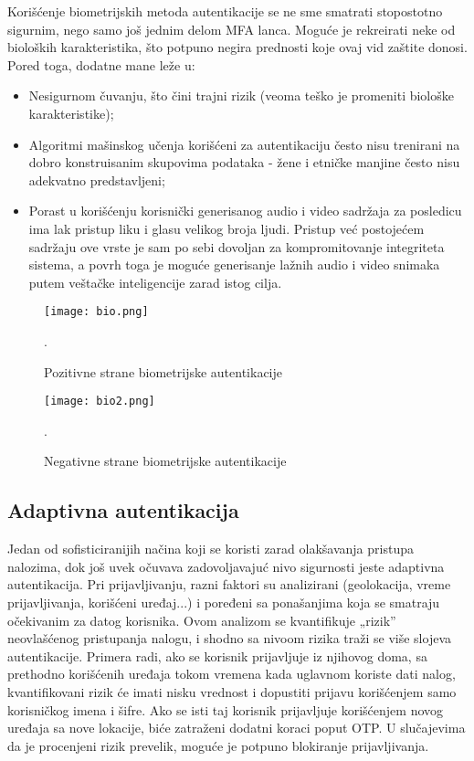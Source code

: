 \documentclass[fleqn, 12pt]{article}
\begin{document}
Korišćenje biometrijskih metoda autentikacije se ne sme smatrati stopostotno sigurnim, nego samo još jednim delom MFA lanca. Moguće je rekreirati neke od bioloških karakteristika, što potpuno negira prednosti koje ovaj vid zaštite donosi\cite{bio}. Pored toga, dodatne mane leže u:

\begin{itemize}
    \item Nesigurnom čuvanju, što čini trajni rizik (veoma teško je promeniti biološke karakteristike);
    \item Algoritmi mašinskog učenja korišćeni za autentikaciju često nisu trenirani na dobro konstruisanim skupovima podataka - žene i etničke manjine često nisu adekvatno predstavljeni;
    \item Porast u korišćenju korisnički generisanog audio i video sadržaja za posledicu ima lak pristup liku i glasu velikog broja ljudi. Pristup već postojećem sadržaju ove vrste je sam po sebi dovoljan za kompromitovanje integriteta sistema, a povrh toga je moguće generisanje lažnih audio i video snimaka putem veštačke inteligencije zarad istog cilja.
\end{itemize}

\begin{figure}[H]
    \centering
    \texttt{[image: bio.png]}
    \caption{Pozitivne strane biometrijske autentikacije\cite{bio}}.
    \label{fig:enter-label}
\end{figure}

\begin{figure}[H]
    \centering
    \texttt{[image: bio2.png]}
    \caption{Negativne strane biometrijske autentikacije\cite{bio}}.
    \label{fig:enter-label}
\end{figure}

\subsection{Adaptivna autentikacija}
\indent Jedan od sofisticiranijih načina koji se koristi zarad olakšavanja pristupa nalozima, dok još uvek očuvava zadovoljavajuć nivo sigurnosti jeste adaptivna autentikacija. Pri prijavljivanju, razni faktori su analizirani (geolokacija, vreme prijavljivanja, korišćeni uređaj...) i poređeni sa ponašanjima koja se smatraju očekivanim za datog korisnika. Ovom analizom se kvantifikuje „rizik'' neovlašćenog pristupanja nalogu, i shodno sa nivoom rizika traži se više slojeva autentikacije. Primera radi, ako se korisnik prijavljuje iz njihovog doma, sa prethodno korišćenih uređaja tokom vremena kada uglavnom koriste dati nalog, kvantifikovani rizik će imati nisku vrednost i dopustiti prijavu korišćenjem samo korisničkog imena i šifre. Ako se isti taj korisnik prijavljuje korišćenjem novog uređaja sa nove lokacije, biće zatraženi dodatni koraci poput OTP. U slučajevima da je procenjeni rizik prevelik, moguće je potpuno blokiranje prijavljivanja\cite{adaptive}. 
\end{document}
